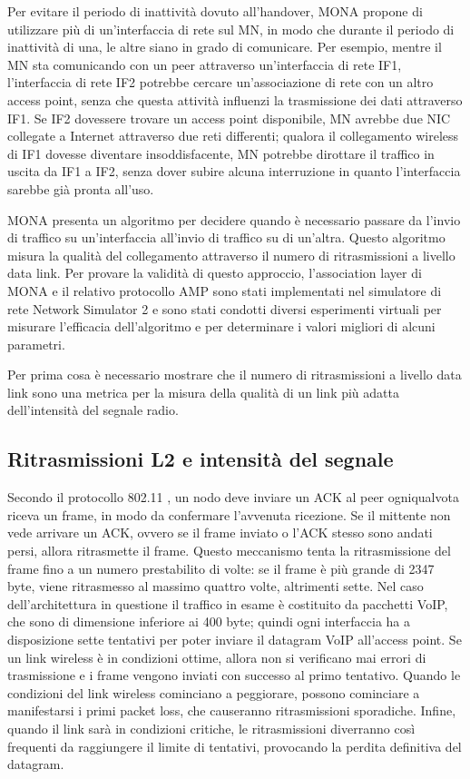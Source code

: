 \documentclass[12pt,a4paper,openright,twoside]{book}
\begin{document}
Per evitare il periodo di inattività dovuto all'handover, MONA propone
di utilizzare più di un'interfaccia di rete sul MN, in modo che
durante il periodo di inattività di una, le altre siano in grado di
comunicare. Per esempio, mentre il MN sta comunicando con un peer
attraverso un'interfaccia di rete IF1, l'interfaccia di rete IF2
potrebbe cercare un'associazione di rete con un altro access point,
senza che questa attività influenzi la trasmissione dei dati
attraverso IF1. Se IF2 dovessere trovare un access point disponibile,
MN avrebbe due NIC collegate a Internet attraverso due reti
differenti; qualora il collegamento wireless di IF1 dovesse diventare
insoddisfacente, MN potrebbe dirottare il traffico in uscita da IF1 a
IF2, senza dover subire alcuna interruzione in quanto l'interfaccia
sarebbe già pronta all'uso.

MONA presenta un algoritmo per decidere quando è necessario passare
da l'invio di traffico su un'interfaccia all'invio di traffico su di
un'altra. Questo algoritmo misura la qualità del collegamento
attraverso il numero di ritrasmissioni a livello data link. Per
provare la validità di questo approccio, l'association layer di MONA e
il relativo protocollo AMP sono stati implementati nel simulatore di
rete Network Simulator 2 e sono stati condotti diversi esperimenti
virtuali per misurare l'efficacia dell'algoritmo e per determinare i
valori migliori di alcuni parametri.

Per prima cosa è necessario mostrare che il numero di ritrasmissioni a
livello data link sono una metrica per la misura della qualità di un
link più adatta dell'intensità del segnale radio.

\subsection{Ritrasmissioni L2 e intensità del segnale}

Secondo il protocollo 802.11 \cite{bib:802.11}, un nodo deve inviare
un ACK al peer ogniqualvota riceva un frame, in modo da confermare
l'avvenuta ricezione. Se il mittente non vede arrivare un ACK, ovvero
se il frame inviato o l'ACK stesso sono andati persi, allora
ritrasmette il frame. Questo meccanismo tenta la ritrasmissione del
frame fino a un numero prestabilito di volte: se il frame è più grande
di 2347 byte, viene ritrasmesso al massimo quattro volte, altrimenti
sette. Nel caso dell'architettura in questione il traffico in esame è
costituito da pacchetti VoIP, che sono di dimensione inferiore ai 400
byte; quindi ogni interfaccia ha a disposizione sette tentativi per
poter inviare il datagram VoIP all'access point. Se un link wireless è
in condizioni ottime, allora non si verificano mai errori di
trasmissione e i frame vengono inviati con successo al primo
tentativo. Quando le condizioni del link wireless cominciano a
peggiorare, possono cominciare a manifestarsi i primi packet loss, che
causeranno ritrasmissioni sporadiche. Infine, quando il link sarà in
condizioni critiche, le ritrasmissioni diverranno così frequenti da
raggiungere il limite di tentativi, provocando la perdita definitiva
del datagram.
\end{document}
